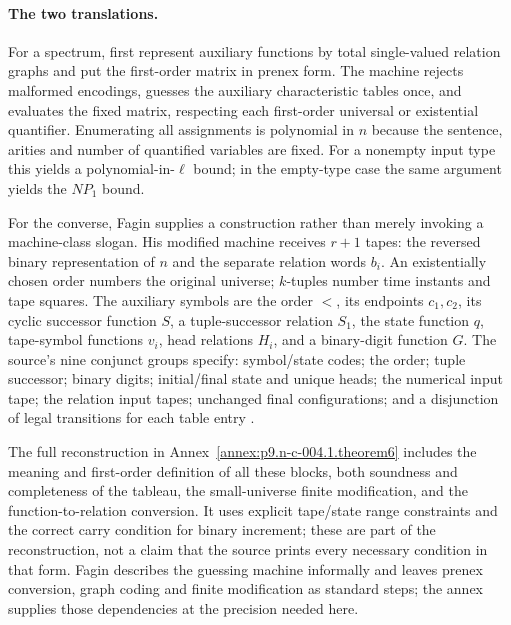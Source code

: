\paragraph{The two translations.}
For a spectrum, first represent auxiliary functions by total single-valued
relation graphs and put the first-order matrix in prenex form.  The machine
rejects malformed encodings, guesses the auxiliary characteristic tables once,
and evaluates the fixed matrix, respecting each first-order universal or
existential quantifier.  Enumerating all assignments is polynomial in \(n\)
because the sentence, arities and number of quantified variables are fixed.
For a nonempty input type this yields a polynomial-in-\(\ell\) bound;
in the empty-type case the same argument yields the \(NP_1\) bound.

For the converse, Fagin supplies a construction rather than merely invoking
a machine-class slogan.  His modified machine receives \(r+1\) tapes:
the reversed binary representation of \(n\) and the separate relation words
\(b_i\).  An existentially chosen order numbers the original universe;
\(k\)-tuples number time instants and tape squares.  The auxiliary symbols
are the order \(<\), its endpoints \(c_1,c_2\), its cyclic successor
function \(S\), a tuple-successor relation \(S_1\), the state function
\(q\), tape-symbol functions \(v_i\), head relations \(H_i\), and a
binary-digit function \(G\).  The source's nine conjunct groups specify:
symbol/state codes; the order; tuple successor; binary digits; initial/final
state and unique heads; the numerical input tape; the relation input tapes;
unchanged final configurations; and a disjunction of legal transitions for
each table entry \cite[pp.~54--58]{Fagin1974}.

The full reconstruction in Annex~\ref{annex:p9.n-c-004.1.theorem6} includes
the meaning and first-order definition of all these blocks, both soundness and
completeness of the tableau, the small-universe finite modification, and the
function-to-relation conversion.  It uses explicit tape/state range constraints
and the correct carry condition for binary increment; these are part of the
reconstruction, not a claim that the source prints every necessary condition
in that form.  Fagin describes the guessing machine informally and leaves
prenex conversion, graph coding and finite modification as standard steps;
the annex supplies those dependencies at the precision needed here.

